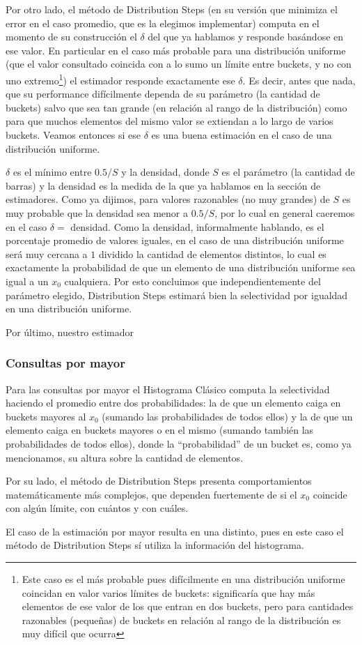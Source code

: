 Por otro lado, el método de Distribution Steps (en su versión que minimiza el error en el caso promedio, que es la elegimos implementar) computa en el momento de su construcción el $\delta$ del que ya hablamos y responde basándose en ese valor. En particular en el caso más probable para una distribución uniforme (que el valor consultado coincida con a lo sumo un límite entre buckets, y no con uno extremo\footnote{Este caso es el más probable pues difícilmente en una distribución uniforme coincidan en valor varios límites de buckets: significaría que hay más elementos de ese valor de los que entran en dos buckets, pero para cantidades razonables (pequeñas) de buckets en relación al rango de la distribución es muy difícil que ocurra}) el estimador responde exactamente ese $\delta$. Es decir, antes que nada, que su performance difícilmente dependa de su parámetro (la cantidad de buckets) salvo que sea tan grande (en relación al rango de la distribución) como para que muchos elementos del mismo valor se extiendan a lo largo de varios buckets. Veamos entonces si ese $\delta$ es una buena estimación en el caso de una distribución uniforme.

$\delta$ es el mínimo entre $0.5/S$ y la densidad, donde $S$ es el parámetro (la cantidad de barras) y la densidad es la medida de la que ya hablamos en la sección de estimadores. Como ya dijimos, para valores razonables (no muy grandes) de $S$ es muy probable que la densidad sea menor a $0.5/S$, por lo cual en general caeremos en el caso $\delta = $ densidad. Como la densidad, informalmente hablando, es el porcentaje promedio de valores iguales, en el caso de una distribución uniforme será muy cercana a $1$ dividido la cantidad de elementos distintos, lo cual es exactamente la probabilidad de que un elemento de una distribución uniforme sea igual a un $x_0$ cualquiera. Por esto concluimos que independientemente del parámetro elegido, Distribution Steps estimará bien la selectividad por igualdad en una distribución uniforme.

Por último, nuestro estimador 

\subsubsection{Consultas por mayor}
Para las consultas por mayor el Histograma Clásico computa la selectividad haciendo el promedio entre dos probabilidades: la de que un elemento caiga en buckets mayores al $x_0$ (sumando las probabilidades de todos ellos) y la de que un elemento caiga en buckets mayores o en el mismo (sumando también las probabilidades de todos ellos), donde la ``probabilidad'' de un bucket es, como ya mencionamos, su altura sobre la cantidad de elementos.

Por su lado, el método de Distribution Steps presenta comportamientos matemáticamente más complejos, que dependen fuertemente de si el $x_0$ coincide con algún límite, con cuántos y con cuáles.





El caso de la estimación por mayor resulta en una distinto, pues en este caso el método de Distribution Steps sí utiliza la información del histograma.
